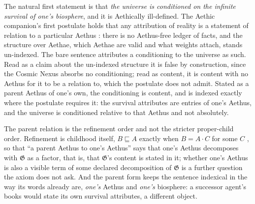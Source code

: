 \begin{remark}
\label{gc:rem:axiomparent}
The natural first statement is that \emph{the universe is conditioned on
the infinite survival of one's biosphere}, and it is Aethically
ill-defined. The Aethic companion's first postulate holds that any
attribution of reality is a statement of relation to a particular Aethus
\cite{Aethus}: there is no Aethus-free ledger of facts, and the
structure over Aethae, which Aethae are valid and what weights attach,
stands un-indexed. The bare sentence attributes a conditioning to the
universe as such. Read as a claim about the un-indexed structure it is
false by construction, since the Cosmic Nexus absorbs no conditioning;
read as content, it is content with no Aethus for it to be a relation
to, which the postulate does not admit. Stated as a parent Aethus of
one's own, the conditioning is content, and is indexed exactly where the
postulate requires it: the survival attributes are entries of one's
Aethus, and the universe is conditioned relative to that Aethus and not
absolutely.

The parent relation is the refinement order and not the stricter
proper-child order. Refinement is childhood itself, $B\sqsubseteq A$
exactly when $B=A\cdot C$ for some $C$ \cite{Aethus, AethusTree}, so that
``a parent Aethus to one's Aethus'' says that one's Aethus decomposes
with $\mathfrak G$ as a factor, that is, that $\mathfrak G$'s content is
stated in it; whether one's Aethus is also a visible term of some
declared decomposition of $\mathfrak G$ is a further question the axiom
does not ask. And the parent form keeps the sentence indexical in the way
its words already are, \emph{one's} Aethus and \emph{one's} biosphere: a
successor agent's books would state its own survival attributes, a
different object.
\end{remark}

